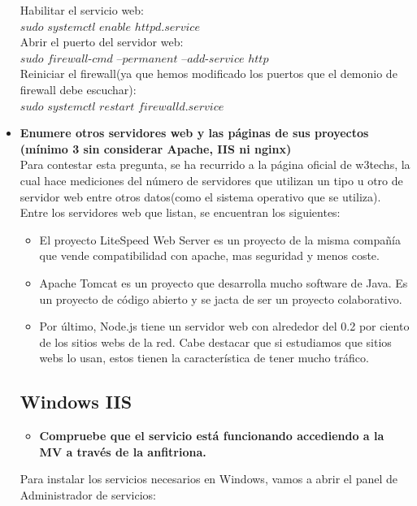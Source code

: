 \begin{itemize}
	Habilitar el servicio web:\\
	
	$sudo$ $systemctl$ $enable$ $httpd$.$service$\\
	
	Abrir el puerto del servidor web:\\
	
	$sudo$ $firewall$-$cmd$ --$permanent$ --$add$-$service$ $http$\\
	
	Reiniciar el firewall(ya que hemos modificado los puertos que el demonio de firewall debe escuchar):\\
	
	$sudo$ $systemctl$ $restart$ $firewalld$.$service$\\
	
	
	\item \textbf{Enumere otros servidores web y las páginas de sus proyectos (mínimo 3 sin considerar Apache, IIS ni nginx)}\\
	Para contestar esta pregunta, se ha recurrido a la página oficial de w3techs\cite{w3tech}, la cual hace mediciones del número de servidores que utilizan un tipo u otro de servidor web entre otros datos(como el sistema operativo que se utiliza). Entre los servidores web que listan, se encuentran los siguientes:\\
	
	
	\begin{itemize}
		\item El proyecto LiteSpeed Web Server\cite{liteSpeed} es un proyecto de la misma compañía que vende compatibilidad con apache, mas seguridad y menos coste. 
		
		\item Apache Tomcat\cite{Tomcat} es un proyecto que desarrolla mucho software de Java. Es un proyecto de código abierto y se jacta de ser un proyecto colaborativo.
		
		\item Por último, Node.js\cite{nodejs} tiene un servidor web con alrededor del 0.2 por ciento de los sitios webs de la red. Cabe destacar que si estudiamos que sitios webs lo usan, estos tienen la característica de tener mucho tráfico.
		
	\end{itemize}

	
	\subsection{Windows IIS}
	\begin{itemize}
		\item \textbf{Compruebe que el servicio está funcionando accediendo a la MV a través de la anfitriona.}\\
	\end{itemize}
	Para instalar los servicios necesarios en Windows, vamos a abrir el panel de Administrador de servicios:\\
		

\end{itemize}

